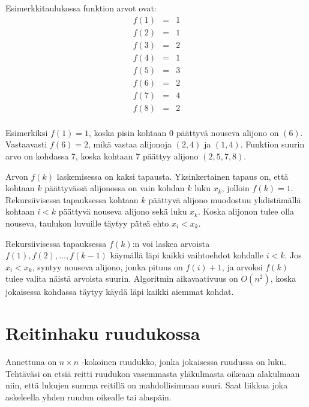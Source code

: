 Esimerkkitaulukossa funktion arvot ovat:
\[
\begin{array}{lcl}
f(1) & = & 1 \\
f(2) & = & 1 \\
f(3) & = & 2 \\
f(4) & = & 1 \\
f(5) & = & 3 \\
f(6) & = & 2 \\
f(7) & = & 4 \\
f(8) & = & 2 \\
\end{array}
\]

Esimerkiksi $f(1)=1$,
koska pisin kohtaan 0 päättyvä nouseva alijono on $(6)$.
Vastaavasti $f(6)=2$,
mikä vastaa alijonoja $(2,4)$ ja $(1,4)$.
Funktion suurin arvo on kohdassa 7,
koska kohtaan 7 päättyy alijono $(2,5,7,8)$.

Arvon $f(k)$ laskemisessa on kaksi tapausta.
Yksinkertainen tapaus on, että kohtaan $k$
päättyvässä alijonossa on vain kohdan $k$ luku $x_k$,
jolloin $f(k)=1$.
Rekursiivisessa tapauksessa kohtaan $k$ päättyvä alijono
muodostuu yhdistämällä
kohtaan $i<k$ päättyvä nouseva alijono
sekä luku $x_k$.
Koska alijonon tulee olla nouseva,
taulukon luvuille täytyy päteä ehto $x_i < x_k$.

Rekursiivisessa tapauksessa $f(k)$:n
voi laskea arvoista
$f(1),f(2),\ldots,f(k-1)$
käymällä läpi kaikki vaihtoehdot
kohdalle $i<k$.
Jos $x_i<x_k$, syntyy nouseva alijono,
jonka pituus on $f(i)+1$,
ja arvoksi $f(k)$ tulee valita näistä arvoista suurin.
Algoritmin aikavaativuus on $O(n^2)$,
koska jokaisessa kohdassa täytyy käydä
läpi kaikki aiemmat kohdat.


\section{Reitinhaku ruudukossa}

\begin{task}
Annettuna on $n \times n$ -kokoinen ruudukko,
jonka jokaisessa ruudussa on luku.
Tehtäväsi on etsiä reitti ruudukon vasemmasta
yläkulmasta oikeaan alakulmaan niin,
että lukujen summa reitillä on mahdollisimman suuri.
Saat liikkua joka askeleella yhden ruudun
oikealle tai alaspäin.
\end{task}

